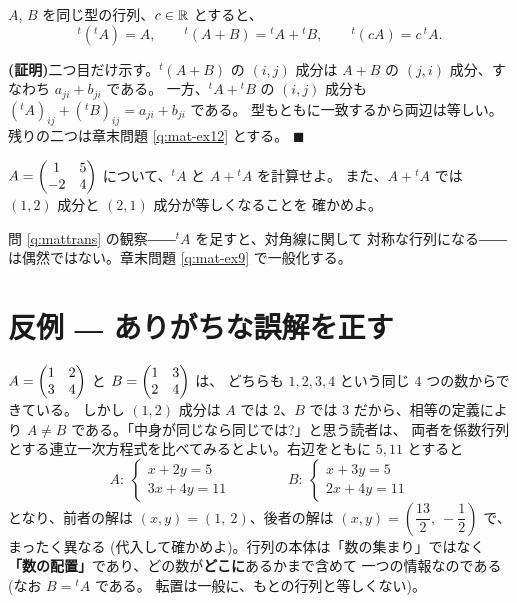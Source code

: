 \begin{teiri}[転置の性質]\label{thm:transpose}
$A$, $B$ を同じ型の行列、$c \in \mathbb{R}$ とすると、
\[
{}^t({}^t\!A) = A, \qquad
{}^t(A + B) = {}^t\!A + {}^t\!B, \qquad
{}^t(cA) = c\,{}^t\!A.
\]
\end{teiri}

\noindent\textbf{(証明)}\quad 二つ目だけ示す。${}^t(A + B)$ の
$(i,j)$ 成分は $A + B$ の $(j,i)$ 成分、すなわち $a_{ji} + b_{ji}$ である。
一方、${}^t\!A + {}^t\!B$ の $(i,j)$ 成分も
$({}^t\!A)_{ij} + ({}^t\!B)_{ij} = a_{ji} + b_{ji}$ である。
型もともに一致するから両辺は等しい。
残りの二つは章末問題 \ref{q:mat-ex12} とする。 $\blacksquare$

\begin{mondai}\label{q:mattrans}
$A = \begin{pmatrix}1 & 5 \\ -2 & 4\end{pmatrix}$ について、${}^t\!A$ と $A + {}^t\!A$ を計算せよ。
また、$A + {}^t\!A$ では $(1,2)$ 成分と $(2,1)$ 成分が等しくなることを
確かめよ。
\end{mondai}

問 \ref{q:mattrans} の観察――${}^t\!A$ を足すと、対角線に関して
対称な行列になる――は偶然ではない。章末問題 \ref{q:mat-ex9} で一般化する。

\section{反例 ― ありがちな誤解を正す}

\begin{hanrei}\label{hanrei:mat-eq}
$A = \begin{pmatrix}1 & 2 \\ 3 & 4\end{pmatrix}$ と $B = \begin{pmatrix}1 & 3 \\ 2 & 4\end{pmatrix}$ は、
どちらも $1, 2, 3, 4$ という同じ $4$ つの数からできている。
しかし $(1,2)$ 成分は $A$ では $2$、$B$ では $3$ だから、相等の定義により
$A \neq B$ である。「中身が同じなら同じでは?」と思う読者は、
両者を係数行列とする連立一次方程式を比べてみるとよい。右辺をともに
$5, 11$ とすると
\[
A:\ \begin{cases} x + 2y = 5 \\ 3x + 4y = 11 \end{cases}
\qquad\qquad
B:\ \begin{cases} x + 3y = 5 \\ 2x + 4y = 11 \end{cases}
\]
となり、前者の解は $(x, y) = (1,\ 2)$、後者の解は
$(x, y) = \left(\dfrac{13}{2},\ -\dfrac{1}{2}\right)$ で、まったく異なる
(代入して確かめよ)。行列の本体は「数の集まり」ではなく
\textbf{「数の配置」}であり、どの数が\textbf{どこに}あるかまで含めて
一つの情報なのである(なお $B = {}^t\!A$ である。
転置は一般に、もとの行列と等しくない)。
\end{hanrei}

